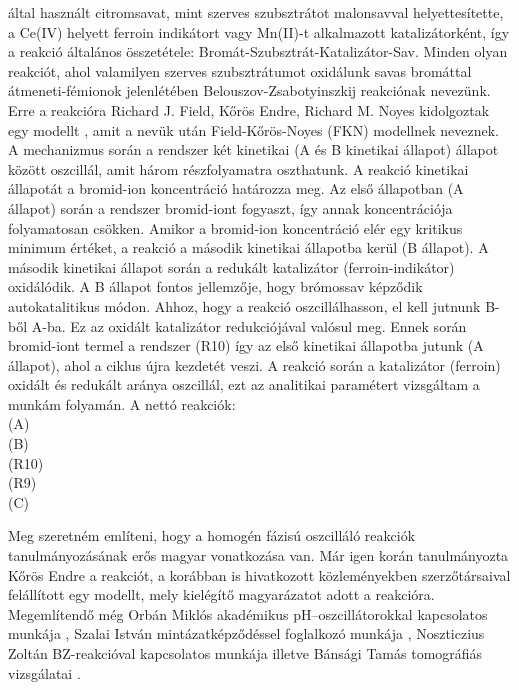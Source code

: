 által használt citromsavat, mint szerves szubsztrátot malonsavval helyettesítette, a Ce(IV) helyett ferroin indikátort vagy Mn(II)-t alkalmazott katalizátorként, így a reakció általános összetétele: Bromát-Szubsztrát-Katalizátor-Sav.\cite{miklososzcillalo}
Minden olyan reakciót, ahol valamilyen szerves szubsztrátumot oxidálunk savas bromáttal átmeneti-fémionok jelenlétében Belouszov-Zsabotyinszkij reakciónak nevezünk. Erre a reakcióra Richard J. Field, Kőrös Endre, Richard M. Noyes kidolgoztak egy modellt \cite{noyes1972oscillations}, amit a nevük után Field-Kőrös-Noyes (FKN) modellnek neveznek. A mechanizmus során a rendszer két kinetikai (A és B kinetikai állapot) állapot között oszcillál, amit három részfolyamatra oszthatunk. A reakció kinetikai állapotát a bromid-ion koncentráció határozza meg.
Az első állapotban (A állapot) során a rendszer bromid-iont fogyaszt, így annak koncentrációja folyamatosan csökken. Amikor a bromid-ion koncentráció elér egy kritikus minimum értéket, a reakció a második kinetikai állapotba kerül (B állapot). A második kinetikai állapot során a redukált katalizátor (ferroin-indikátor) oxidálódik. A B állapot fontos jellemzője, hogy brómossav képződik autokatalitikus módon. Ahhoz, hogy a reakció oszcillálhasson, el kell jutnunk B-ből A-ba. Ez az oxidált katalizátor redukciójával valósul meg. Ennek során bromid-iont termel a rendszer (R10) így az első kinetikai állapotba jutunk (A állapot), ahol a ciklus újra kezdetét veszi. A reakció során a katalizátor (ferroin) oxidált és redukált aránya oszcillál, ezt az analitikai paramétert vizsgáltam a munkám folyamán. A nettó reakciók:\\
 (A)\\
 (B)\\
 (R10)\\
 (R9)\\
 (C)

Meg szeretném említeni, hogy a homogén fázisú oszcilláló reakciók tanulmányozásának erős magyar vonatkozása van. Már igen korán tanulmányozta Kőrös Endre a reakciót, a korábban is hivatkozott közleményekben \cite{field1974oscillations, noyes1972oscillations} szerzőtársaival felállított egy modellt, mely kielégítő magyarázatot adott a reakcióra. Megemlítendő még Orbán Miklós akadémikus pH--oszcillátorokkal kapcsolatos munkája \cite{orban2015ph}, Szalai István mintázatképződéssel foglalkozó munkája \cite{molnar2015pattern}, Noszticzius Zoltán BZ-reakcióval kapcsolatos munkája \cite{noszticzius1987sustained} illetve Bánsági Tamás tomográfiás vizsgálatai \cite{bansagi2011tomography}.

